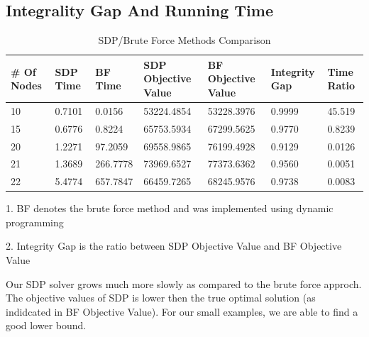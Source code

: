\documentclass{article}
\begin{document}
\subsection{Integrality Gap And Running Time}
\begin{table}[!ht]
\begin{threeparttable}
\caption{SDP/Brute Force Methods Comparison}
\begin{tabular}{|l|l|l|l|l|l|l|}
\hline
\# Of Nodes & SDP  Time & BF Time  & SDP Objective Value & BF Objective Value & Integrity Gap & Time Ratio \\
\hline
10          & 0.7101    & 0.0156   & 53224.4854          & 53228.3976         & 0.9999        & 45.519     \\
15          & 0.6776    & 0.8224   & 65753.5934          & 67299.5625         & 0.9770        & 0.8239     \\
20          & 1.2271    & 97.2059  & 69558.9865          & 76199.4928         & 0.9129        & 0.0126     \\
21          & 1.3689    & 266.7778 & 73969.6527          & 77373.6362         & 0.9560        & 0.0051     \\
22          & 5.4774    & 657.7847 & 66459.7265          & 68245.9576         & 0.9738        & 0.0083     \\
 \hline
\end{tabular}
\begin{tablenotes}
      \small
      \item 1. BF denotes the brute force method and was implemented using dynamic programming
      \item 2. Integrity Gap is the ratio between SDP Objective Value and BF Objective Value
    \end{tablenotes}
\end{threeparttable}
\end{table}

Our SDP solver grows much more slowly as compared to the brute force approch. The objective values of 
SDP is lower then the true optimal solution (as indidcated in BF Objective Value). For our small examples, we
are able to find a good lower bound. 
\end{document}
